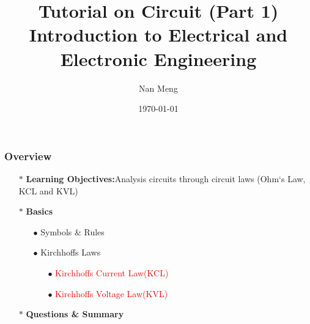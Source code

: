 \documentclass{beamer}
\title[Circuit(ENGG 1203)]{Tutorial on Circuit (Part 1) \newline Introduction to Electrical and Electronic Engineering} %
\author{Nan Meng} %
\institute[Imaging Systems Laboratory] %
{
	University of Hong Kong \\ %
	\medskip
	\textit{u3003637@connect.hku.hk} %
}
\date{\today} %
\newcommand{\red}[1]{\textcolor{red}{#1}}
\begin{document}
\begin{frame}
	\titlepage %
\end{frame}

\begin{frame}
\frametitle{Overview} %

\begin{itemize} \itemsep1pt \parskip0pt 
  \item[$\ast$] {\bf Learning Objectives:}\newline Analysis circuits through circuit laws (Ohm`s Law, KCL and KVL)
  \item[$\ast$] {\bf Basics}
  \begin{itemize} \itemsep1pt \parskip0pt 
    \item[$\bullet$] Symbols \& Rules
    \item[$\bullet$] Kirchhoffs Laws
    \begin{itemize} \itemsep1pt \parskip0pt 
      \item[$\bullet$] \red{Kirchhoffs Current Law(KCL)}
      \item[$\bullet$] \red{Kirchhoffs Voltage Law(KVL)}
    \end{itemize}
  \end{itemize}
  \item[$\ast$] {\bf Questions \& Summary}
\end{itemize}
\end{frame}



\end{document}
